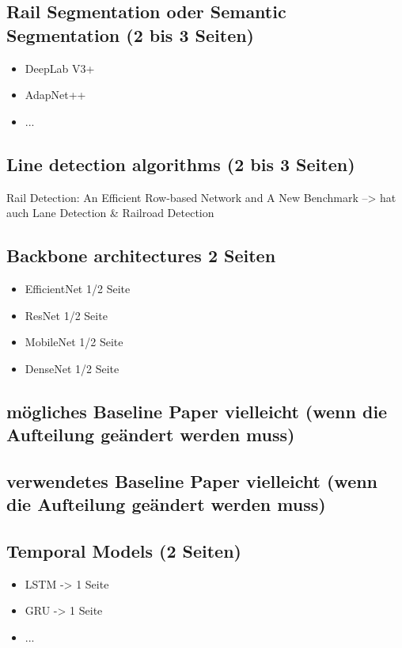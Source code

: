 \subsection{Rail Segmentation oder Semantic Segmentation (2 bis 3 Seiten)}

\begin{itemize}
    \item DeepLab V3+
    \item AdapNet++
    \item ...
\end{itemize}

\subsection{Line detection algorithms (2 bis 3 Seiten)}

Rail Detection: An Efficient Row-based Network and A New Benchmark --> hat auch Lane Detection \& Railroad Detection

\subsection{Backbone architectures 2 Seiten}

\begin{itemize}
    \item EfficientNet 1/2 Seite
    \item ResNet 1/2 Seite
    \item MobileNet 1/2 Seite
    \item DenseNet 1/2 Seite
\end{itemize}

\subsection{mögliches Baseline Paper vielleicht (wenn die Aufteilung geändert werden muss)}

\subsection{verwendetes Baseline Paper vielleicht (wenn die Aufteilung geändert werden muss)}

\subsection{Temporal Models (2 Seiten)}

\begin{itemize}
    \item LSTM -> 1 Seite
    \item GRU -> 1 Seite
    \item ...
\end{itemize}

